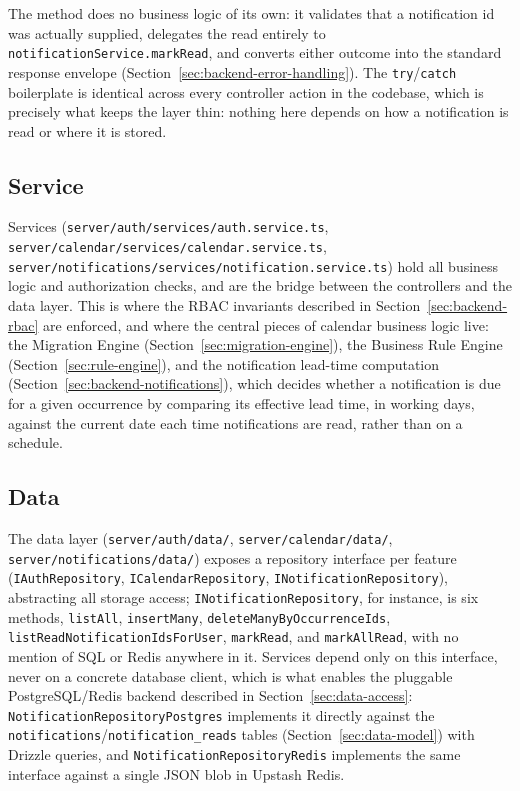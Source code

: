 The method does no business logic of its own: it validates that a notification id was actually supplied, delegates the read entirely to \texttt{notificationService.markRead}, and converts either outcome into the standard response envelope (Section~\ref{sec:backend-error-handling}). The \texttt{try}/\texttt{catch} boilerplate is identical across every controller action in the codebase, which is precisely what keeps the layer thin: nothing here depends on how a notification is read or where it is stored.

\subsection{Service} \label{sec:backend-service}
Services (\texttt{server/auth/services/auth.service.ts}, \texttt{server/calendar/services/calendar.service.ts}, \texttt{server/notifications/services/notification.service.ts}) hold all business logic and authorization checks, and are the bridge between the controllers and the data layer. This is where the RBAC invariants described in Section~\ref{sec:backend-rbac} are enforced, and where the central pieces of calendar business logic live: the Migration Engine (Section~\ref{sec:migration-engine}), the Business Rule Engine (Section~\ref{sec:rule-engine}), and the notification lead-time computation (Section~\ref{sec:backend-notifications}), which decides whether a notification is due for a given occurrence by comparing its effective lead time, in working days, against the current date each time notifications are read, rather than on a schedule.

\subsection{Data} \label{sec:backend-data}
The data layer (\texttt{server/auth/data/}, \texttt{server/calendar/data/}, \texttt{server/notifications/data/}) exposes a repository interface per feature (\texttt{IAuthRepository}, \texttt{ICalendarRepository}, \texttt{INotificationRepository}), abstracting all storage access; \texttt{INotificationRepository}, for instance, is six methods, \texttt{listAll}, \texttt{insertMany}, \texttt{deleteManyByOccurrenceIds}, \texttt{listReadNotificationIdsForUser}, \texttt{markRead}, and \texttt{markAllRead}, with no mention of SQL or Redis anywhere in it. Services depend only on this interface, never on a concrete database client, which is what enables the pluggable PostgreSQL/Redis backend described in Section~\ref{sec:data-access}: \texttt{NotificationRepositoryPostgres} implements it directly against the \texttt{notifications}/\texttt{notification\_reads} tables (Section~\ref{sec:data-model}) with Drizzle queries, and \texttt{NotificationRepositoryRedis} implements the same interface against a single JSON blob in Upstash Redis.

